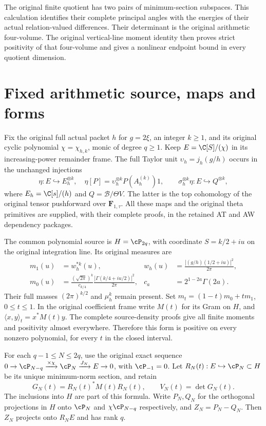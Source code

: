 The original finite quotient has two pairs of minimum-section subspaces.
This calculation identifies their complete principal angles with the
energies of their actual relation-valued differences. Their determinant
is the original arithmetic four-volume. The original vertical-line
moment identity then proves strict positivity of that four-volume and
gives a nonlinear endpoint bound in every quotient dimension.

\section{Fixed arithmetic source, maps and forms}

Fix the original full actual packet $h$ for $g=2\xi$, an integer
$k\ge1$, and its original cyclic polynomial $\chi=\chi_{h,k}$,
monic of degree $q\ge1$. Keep $E=\C[S]/(\chi)$ in its
increasing-power remainder frame. The full Taylor unit
$\upsilon_h=j_h(g/h)$ occurs in the unchanged injections
\[
 \eta:E\hookrightarrow E_h^{\otimes k},\quad
 \eta[P]=\upsilon_h^{\otimes k}P(A_h^{(k)})1,
 \qquad \sigma_h^{\otimes k}\eta:E\hookrightarrow Q^{\otimes k},
 \tag{AGT1}
\]
where $E_h=\C[s]/(h)$ and $Q=\mathscr B/\Theta V$.
The latter is the top cohomology of the original tensor pushforward
over $\mathbf F_{1,\tau}$. All these maps and the original theta
primitives are supplied, with their complete proofs, in the retained
AT and AW dependency packages.

The common polynomial source is $H=\cP_{2q}$, with coordinate
$S=k/2+iu$ on the original integration line. Its original measures
are
\[
 \begin{aligned}
 m_1(u)&=w_h^{*k}(u),&
 w_h(u)&=\frac{|(g/h)(1/2+iu)|^2}{2\pi},\\
 m_0(u)&=\frac{(\sqrt{2\pi})^k}{c_{k/4}}
       \frac{|\Gamma(k/4+iu/2)|^2}{2\pi},&
 c_a&=2^{1-2a}\Gamma(2a).
 \end{aligned}
 \tag{AGT2}
\]
Their full masses $(2\pi)^{k/2}$ and $\mu_h^k$ remain present.
Set $m_t=(1-t)m_0+tm_1$, $0\le t\le1$. In the original coefficient
frame write $M(t)$ for its Gram on $H$, and
$\langle x,y\rangle_t=x^*M(t)y$.
The complete source-density proofs give all finite moments and
positivity almost everywhere. Therefore this form is positive on
every nonzero polynomial, for every $t$ in the closed interval.

For each $q-1\le N\le2q$, use the original exact sequence
$0\to\cP_{N-q}\xrightarrow{\times\chi}\cP_N
\xrightarrow{J_N}E\to0$, with $\cP_{-1}=0$.
Let $R_N(t):E\hookrightarrow\cP_N\subset H$ be its unique
minimum-norm section, and retain
\[
 G_N(t)=R_N(t)^*M(t)R_N(t),\qquad V_N(t)=\det G_N(t).
 \tag{AGT3}
\]
The inclusions into $H$ are part of this formula.
Write $P_N,Q_N$ for the orthogonal projections in $H$ onto
$\cP_N$ and $\chi\cP_{N-q}$ respectively, and
$Z_N=P_N-Q_N$. Then $Z_N$ projects onto $R_NE$ and has rank $q$.

